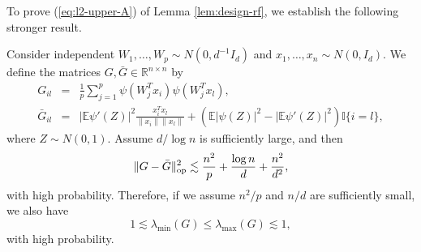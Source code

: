 To prove (\ref{eq:l2-upper-A}) of Lemma \ref{lem:design-rf}, we establish the following stronger result.
\begin{lemma}\label{lem:lim-G}
Consider independent $W_1,\ldots,W_p\sim N(0,d^{-1}I_d)$ and $x_1,\ldots,x_n\sim N(0,I_d)$. We define the matrices $G,\bar{G}\in\mathbb{R}^{n\times n}$ by
\begin{eqnarray*}
G_{il} &=& \frac{1}{p}\sum_{j=1}^p\psi(W^T_jx_i)\psi(W_j^Tx_l), \\
\bar{G}_{il} &=& |\mathbb{E}\psi'(Z)|^2\frac{x_i^Tx_l}{\|x_i\|\|x_l\|} + \left(\mathbb{E}|\psi(Z)|^2-|\mathbb{E}\psi'(Z)|^2\right)\mathbb{I}\{i=l\},
\end{eqnarray*}
where $Z\sim N(0,1)$.
Assume $d/\log n$ is sufficiently large, and then
$$\|G-\bar{G}\|_{\rm op}^2\lesssim \frac{n^2}{p} + \frac{\log n}{d} + \frac{n^2}{d^2},$$
with high probability. Therefore, if we assume $n^2/p$ and $n/d$ are sufficiently small, we also have
\begin{equation}
1\lesssim\lambda_{\min}(G)\leq \lambda_{\max}(G)\lesssim 1, \label{eq:spectrum-G-bound}
\end{equation}
with high probability.
\end{lemma}
